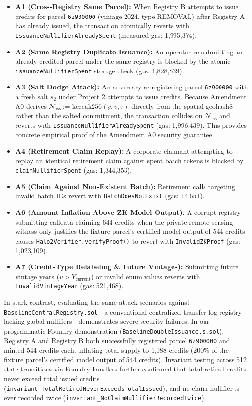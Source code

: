 \documentclass[preprint,12pt]{elsarticle}
\begin{document}
\begin{itemize}
\item \textbf{A1 (Cross-Registry Same Parcel):} When Registry B attempts to issue credits for parcel \texttt{6z900000} (vintage 2024, type REMOVAL) after Registry A has already issued, the transaction atomically reverts with \texttt{IssuanceNullifierAlreadySpent} (measured gas: 1,995,374).
\item \textbf{A2 (Same-Registry Duplicate Issuance):} An operator re-submitting an already credited parcel under the same registry is blocked by the atomic \texttt{issuanceNullifierSpent} storage check (gas: 1,828,839).
\item \textbf{A3 (Salt-Dodge Attack):} An adversary re-registering parcel \texttt{6z900000} with a fresh salt $s_2$ under Project 2 attempts to issue credits. Because Amendment A0 derives $\mathcal{N}_{\text{iss}} := \text{keccak256}(g, v, \tau)$ directly from the spatial geohash8 rather than the salted commitment, the transaction collides on $\mathcal{N}_{\text{iss}}$ and reverts with \texttt{IssuanceNullifierAlreadySpent} (gas: 1,996,439). This provides concrete empirical proof of the Amendment A0 security guarantee.
\item \textbf{A4 (Retirement Claim Replay):} A corporate claimant attempting to replay an identical retirement claim against spent batch tokens is blocked by \texttt{claimNullifierSpent} (gas: 1,344,353).
\item \textbf{A5 (Claim Against Non-Existent Batch):} Retirement calls targeting invalid batch IDs revert with \texttt{BatchDoesNotExist} (gas: 14,651).
\item \textbf{A6 (Amount Inflation Above ZK Model Output):} A corrupt registry submitting calldata claiming 644 credits when the private remote sensing witness only justifies the fixture parcel's certified model output of 544 credits causes \texttt{Halo2Verifier.verifyProof()} to revert with \texttt{InvalidZKProof} (gas: 1,023,109).
\item \textbf{A7 (Credit-Type Relabeling \& Future Vintages):} Submitting future vintage years ($v > Y_{\text{current}}$) or invalid enum values reverts with \texttt{InvalidVintageYear} (gas: 521,468).
\end{itemize}

In stark contrast, evaluating the same attack scenarios against \texttt{BaselineCentralRegistry.sol}—a conventional centralized transfer-log registry lacking global nullifiers—demonstrates severe security failures. In our programmatic Foundry demonstration (\texttt{BaselineDoubleIssuance.s.sol}), Registry A and Registry B both successfully registered parcel \texttt{6z900000} and minted 544 credits each, inflating total supply to 1,088 credits (200\% of the fixture parcel's certified model output of 544 credits). Invariant testing across 512 state transitions via Foundry handlers further confirmed that total retired credits never exceed total issued credits (\texttt{invariant\_TotalRetiredNeverExceedsTotalIssued}), and no claim nullifier is ever recorded twice (\texttt{invariant\_NoClaimNullifierRecordedTwice}).
\end{document}
